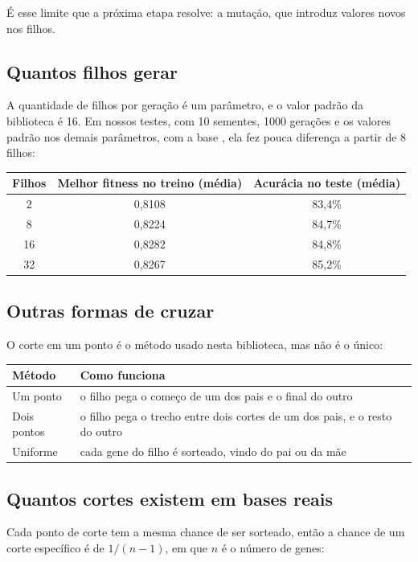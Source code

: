 \documentclass[11pt,a4paper]{article}
\newcommand{\metodo}{10 sementes, 1000 gerações e os valores padrão nos demais parâmetros, com a base \code{dados_binario_1.xlsx}}
\newcommand{\code}[1]{\texttt{\detokenize{#1}}}
\newenvironment{tabela}{\par\nopagebreak[4]\vspace{0.3em}\nopagebreak[4]\begingroup\centering\small}{\par\endgroup\vspace{0.6em}}
\begin{document}
É esse limite que a próxima etapa resolve: a mutação, que introduz valores novos nos filhos.

\subsection{Quantos filhos gerar}

A quantidade de filhos por geração é um parâmetro, e o valor padrão da biblioteca é 16. Em nossos testes, com \metodo, ela fez pouca diferença a partir de 8 filhos:

\begin{tabela}
\begin{tabular}{ccc}
\toprule
Filhos & Melhor fitness no treino (média) & Acurácia no teste (média)\\
\midrule
2 & 0,8108 & 83,4\%\\
8 & 0,8224 & 84,7\%\\
16 & 0,8282 & 84,8\%\\
32 & 0,8267 & 85,2\%\\
\bottomrule
\end{tabular}
\end{tabela}

\subsection{Outras formas de cruzar}

O corte em um ponto é o método usado nesta biblioteca, mas não é o único:

\begin{tabela}
\begin{tabularx}{\linewidth}{lL}
\toprule
Método & Como funciona\\
\midrule
Um ponto & o filho pega o começo de um dos pais e o final do outro\\
Dois pontos & o filho pega o trecho entre dois cortes de um dos pais, e o resto do outro\\
Uniforme & cada gene do filho é sorteado, vindo do pai ou da mãe\\
\bottomrule
\end{tabularx}
\end{tabela}

\subsection{Quantos cortes existem em bases reais}

Cada ponto de corte tem a mesma chance de ser sorteado, então a chance de um corte específico é de $1/(n-1)$, em que $n$ é o número de genes:
\end{document}
